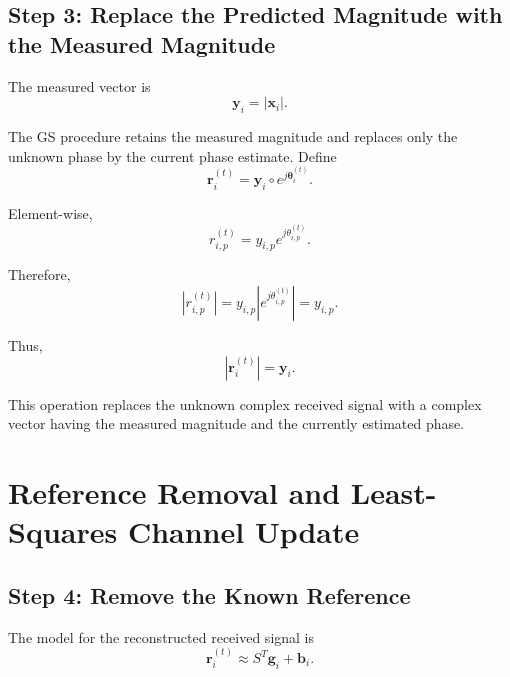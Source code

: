 \documentclass[12pt,a4paper]{article}
\begin{document}
\subsection{Step 3: Replace the Predicted Magnitude with the Measured Magnitude}

The measured vector is
\begin{equation}
\mathbf y_i
=
|\mathbf x_i|.
\tag{294}
\end{equation}

The GS procedure retains the measured magnitude and replaces only the
unknown phase by the current phase estimate. Define
\begin{equation}
\boxed{
\mathbf r_i^{(t)}
=
\mathbf y_i\circ e^{j\boldsymbol\theta_i^{(t)}}
}.
\tag{295}
\end{equation}

Element-wise,
\begin{equation}
\boxed{
r_{i,p}^{(t)}
=
y_{i,p}e^{j\theta_{i,p}^{(t)}}
}.
\tag{296}
\end{equation}

Therefore,
\begin{equation}
\left|
r_{i,p}^{(t)}
\right|
=
y_{i,p}
\left|
e^{j\theta_{i,p}^{(t)}}
\right|
=
y_{i,p}.
\tag{297}
\end{equation}

Thus,
\begin{equation}
\boxed{
|\mathbf r_i^{(t)}|
=
\mathbf y_i
}.
\tag{298}
\end{equation}

This operation replaces the unknown complex received signal with a
complex vector having the measured magnitude and the currently
estimated phase.

\section{Reference Removal and Least-Squares Channel Update}

\subsection{Step 4: Remove the Known Reference}

The model for the reconstructed received signal is
\begin{equation}
\mathbf r_i^{(t)}
\approx
S^T\mathbf g_i+\mathbf b_i.
\tag{299}
\end{equation}
\end{document}
